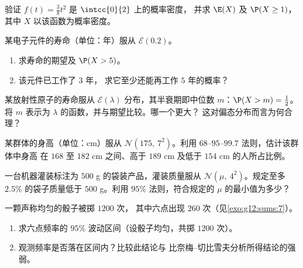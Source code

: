 \begin{exercise}[$\star$]\label{exo:g12:contdist:2}
验证 $f(t) = \frac{3}{8}t^2$ 是 $\intcc{0}{2}$ 上的概率密度，
并求 $\E(X)$ 及 $\P(X \geq 1)$，其中 $X$ 以该函数为概率密度。
\end{exercise}

\begin{exercise}[$\star$]\label{exo:g12:contdist:3}
某电子元件的寿命（单位：年）服从
$\mathcal E(0.2)$。
\begin{enumerate}
  \item 求寿命的期望及 $\P(X > 5)$。
  \item 该元件已工作了 $3$ 年，
        求它至少还能再工作 $5$ 年的概率？
\end{enumerate}
\end{exercise}

\begin{exercise}[$\star\star$]\label{exo:g12:contdist:4}
某放射性原子的寿命服从
$\mathcal E(\lambda)$ 分布，其半衰期即中位数 $m$：$\P(X > m) = \frac12$。
将 $m$ 表示为 $\lambda$ 的函数，并与期望比较。哪一个更大？
这对偏态分布而言为何合理？
\end{exercise}

\begin{exercise}[$\star\star$]\label{exo:g12:contdist:5}
某群体的身高（单位：cm）服从 $\mathcal N(175,\ 7^2)$。利用
$68$--$95$--$99.7$ 法则，估计该群体中身高
在 $168$ 至 $182$ cm 之间、高于 $189$ cm 及低于 $154$ cm 的人所占比例。
\end{exercise}

\begin{exercise}[$\star\star$]\label{exo:g12:contdist:6}
一台机器灌装标注为 $500$ g 的袋装产品，灌装质量服从
$\mathcal N(\mu,\ 4^2)$。规定至多 $2.5\%$ 的袋子质量低于
$500$ g。利用 $95\%$ 法则，符合规定的
$\mu$ 的最小值为多少？
\end{exercise}

\begin{exercise}[$\star\star$]\label{exo:g12:contdist:7}
一颗声称均匀的骰子被掷 $1200$ 次，
其中六点出现 $260$ 次（见\cref{exo:g12:sums:7}）。
\begin{enumerate}
  \item 求六点频率的 $95\%$
        波动区间（设骰子均匀，共掷 $1200$ 次）。
  \item 观测频率是否落在区间内？比较此结论与
        比奈梅–切比雪夫分析所得结论的强弱。
\end{enumerate}
\end{exercise}

